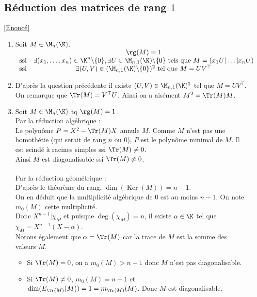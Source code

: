 \documentclass[8pt]{book}
\begin{document}
	\subsection{Réduction des matrices de rang $1$}
	\label{Réduction des matrices de rang 1 corrigé}
	\textcolor{blue}{\hyperref[Réduction des matrices de rang 1]{[Enoncé]}}\\
	\begin{enumerate}
		\item Soit $M\in\M_n(\K)$.\\
		$\begin{array}{ccc}
			& \rg(M)=1\\
			\mbox{ssi} & \exists (x_1,\dots,x_n)\in\K^n\backslash\{0\}, \exists U\in\M_{n,1}(\K)\backslash\{0\}\text{ tels que }M=\left(x_1U|\dots|x_nU\right) \\
			\mbox{ssi} & \exists (U,V)\in(\M_{n,1}(\K)\backslash\{0\})^2\text{ tel que }M=UV^\top
		\end{array}$
		\item D'après la question précédente il existe $(U,V)\in \M_{n,1}(\K)^2$ tel que $M=UV^\top$.\\
		On remarque que $\Tr(M)=V^\top U$. Ainsi on a aisément $M^2=\Tr(M)M$.
		\item Soit $M\in\M_n(\K)$ tq $\rg(M)=1$.\\
		Par la réduction algébrique :\\
		Le polynôme $P=X^2-\Tr(M)X$ annule $M$. Comme $M$ n'est pas une homothétie (qui serait de rang $n$ ou $0$), $P$ est le polynôme minimal de $M$. Il est scindé à racines simples ssi $\Tr(M)\ne 0$.\\
		Ainsi $M$ est diagonalisable ssi $\Tr(M)\ne 0$.\\\\
		Par la réduction géométrique :\\
		D'après le théorème du rang, $\dim(\operatorname{Ker}(M))=n-1$.\\
		On en déduit que la multiplicité algébrique de $0$ est au moins $n-1$. On note $m_0(M)$ cette multiplicité.
		\\Donc $X^{n-1}|\chi_M$ et puisque $\operatorname{deg}(\chi_M)=n$, il existe $\alpha\in\K$ tel que $\chi_M=X^{n-1}(X-\alpha)$.
		\\Notons également que $\alpha=\Tr(M)$ car la trace de $M$ est la somme des valeurs $M$. 
		\begin{itemize}
			\item Si $\Tr(M)=0$, on a $m_0(M)>n-1$ donc $M$ n'est pas diagonalisable.
			\item Si $\Tr(M)\ne 0$, $m_0(M)=n-1$ et $\dim(E_{\Tr(M)}(M))=1=m_{\Tr(M)}(M)$. Donc $M$ est diagonalisable.

\end{itemize}
\end{enumerate}
\end{document}
